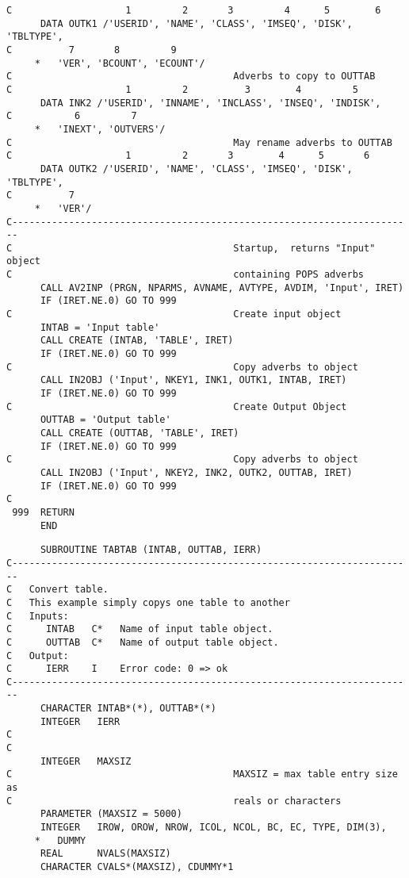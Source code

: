 {\begin{verbatim}
C                    1         2       3         4      5        6
      DATA OUTK1 /'USERID', 'NAME', 'CLASS', 'IMSEQ', 'DISK', 'TBLTYPE',
C          7       8         9
     *   'VER', 'BCOUNT', 'ECOUNT'/
C                                       Adverbs to copy to OUTTAB
C                    1         2          3        4         5
      DATA INK2 /'USERID', 'INNAME', 'INCLASS', 'INSEQ', 'INDISK',
C           6         7
     *   'INEXT', 'OUTVERS'/
C                                       May rename adverbs to OUTTAB
C                    1         2       3        4      5       6
      DATA OUTK2 /'USERID', 'NAME', 'CLASS', 'IMSEQ', 'DISK', 'TBLTYPE',
C          7
     *   'VER'/
C-----------------------------------------------------------------------
C                                       Startup,  returns "Input" object
C                                       containing POPS adverbs
      CALL AV2INP (PRGN, NPARMS, AVNAME, AVTYPE, AVDIM, 'Input', IRET)
      IF (IRET.NE.0) GO TO 999
C                                       Create input object
      INTAB = 'Input table'
      CALL CREATE (INTAB, 'TABLE', IRET)
      IF (IRET.NE.0) GO TO 999
C                                       Copy adverbs to object
      CALL IN2OBJ ('Input', NKEY1, INK1, OUTK1, INTAB, IRET)
      IF (IRET.NE.0) GO TO 999
C                                       Create Output Object
      OUTTAB = 'Output table'
      CALL CREATE (OUTTAB, 'TABLE', IRET)
      IF (IRET.NE.0) GO TO 999
C                                       Copy adverbs to object
      CALL IN2OBJ ('Input', NKEY2, INK2, OUTK2, OUTTAB, IRET)
      IF (IRET.NE.0) GO TO 999
C
 999  RETURN
      END
\end{verbatim}
\begin{verbatim}
      SUBROUTINE TABTAB (INTAB, OUTTAB, IERR)
C-----------------------------------------------------------------------
C   Convert table.
C   This example simply copys one table to another
C   Inputs:
C      INTAB   C*   Name of input table object.
C      OUTTAB  C*   Name of output table object.
C   Output:
C      IERR    I    Error code: 0 => ok
C-----------------------------------------------------------------------
      CHARACTER INTAB*(*), OUTTAB*(*)
      INTEGER   IERR
C
C
      INTEGER   MAXSIZ
C                                       MAXSIZ = max table entry size as
C                                       reals or characters
      PARAMETER (MAXSIZ = 5000)
      INTEGER   IROW, OROW, NROW, ICOL, NCOL, BC, EC, TYPE, DIM(3),
     *   DUMMY
      REAL      NVALS(MAXSIZ)
      CHARACTER CVALS*(MAXSIZ), CDUMMY*1

\end{verbatim}}
